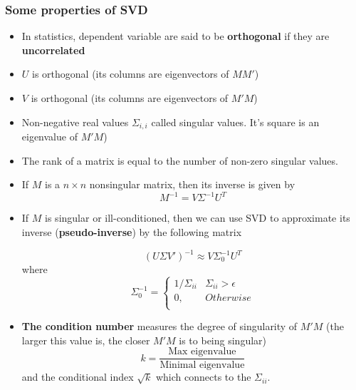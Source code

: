 \documentclass[10pt]{beamer}
\begin{document}
\begin{frame}[allowframebreaks]
  \frametitle{Some properties of SVD}

  \begin{itemize}
  \item In statistics, dependent variable are said to be
    \textbf{orthogonal} if they are \textbf{uncorrelated}

  \item $U$ is orthogonal (its columns are eigenvectors of $MM'$)

  \item $V$ is orthogonal (its columns are eigenvectors of $M'M$)

  \item Non-negative real values $\Sigma_{i,i}$ called singular values.
    It's square is an eigenvalue of $M'M$)

  \item The rank of a matrix is equal to the number of non-zero
    singular values.

  \item If $M$ is a $n\times n$ nonsingular matrix, then its inverse
    is given by
    \begin{equation*}
      M^{-1} = V \Sigma^{-1} U^T
    \end{equation*}


  \item If $M$ is singular or ill-conditioned, then we can use SVD to
    approximate its inverse (\textbf{pseudo-inverse}) by the following matrix

    \begin{equation*}
       (U\Sigma V')^{-1} \approx V \Sigma_0^{-1} U^T
    \end{equation*}
    where
    \begin{equation*}
      \Sigma_0^{-1} = \begin{cases}
        1/\Sigma_{ii} & \Sigma_{ii} > \epsilon\\
        0, & Otherwise\\
      \end{cases}
    \end{equation*}

  \item \textbf{The condition number} measures the degree of
    singularity of $M'M$ (the larger this value is, the closer $M'M$
    is to being singular)
        \begin{equation*}
          k = \frac{\text{Max eigenvalue}}{\text{Minimal eigenvalue}}
        \end{equation*}
        and the conditional index $\sqrt{k}$ which connects to the
        $\Sigma_{ii}$.

  \end{itemize}

\end{frame}
\end{document}
